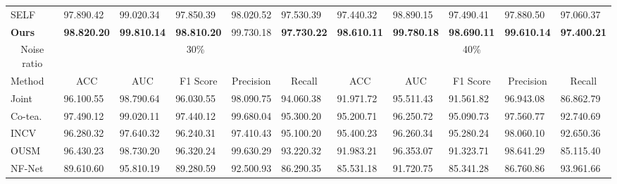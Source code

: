 \begin{table*}[]
\begin{tabular}{@{}lllllllllll@{}}
SELF                            & 97.890.42          & 99.020.34          & 97.850.39               & 98.020.52          & 97.530.39             & 97.440.32          & 98.890.15          & 97.490.41               & 97.880.50          & 97.060.37             \\
\textbf{Ours}                   & \textbf{98.820.20} & \textbf{99.810.14} & \textbf{98.810.20}      & 99.730.18          & \textbf{97.730.22}    & \textbf{98.610.11} & \textbf{99.780.18} & \textbf{98.690.11}      & \textbf{99.610.14} & \textbf{97.400.21}    \\ \midrule
\multicolumn{1}{c}{Noise ratio} & \multicolumn{5}{c}{30\%}                                                                                                                & \multicolumn{5}{c}{40\%}                                                                                                                \\ \midrule
Method                & \multicolumn{1}{c}{ACC} & \multicolumn{1}{c}{AUC} & \multicolumn{1}{c}{F1 Score} & \multicolumn{1}{c}{{Precision}} & \multicolumn{1}{c}{Recall} & \multicolumn{1}{c}{ACC} & \multicolumn{1}{c}{AUC} & \multicolumn{1}{c}{F1 Score} & \multicolumn{1}{c}{{Precision}} & \multicolumn{1}{c}{Recall} \\ \midrule
Joint                     & 96.100.55          & 98.790.64          & 96.030.55               & 98.090.75          & 94.060.38             & 91.971.72          & 95.511.43          & 91.561.82               & 96.943.08          & 86.862.79             \\
Co-tea.                     & 97.490.12          & 99.020.11          & 97.440.12               & 99.680.04          & 95.300.20             & 95.200.71          & 96.250.72          & 95.090.73               & 97.560.77          & 92.740.69             \\
INCV                            & 96.280.32          & 97.640.32          & 96.240.31               & 97.410.43          & 95.100.20             & 95.400.23          & 96.260.34          & 95.280.24               & 98.060.10          & 92.650.36             \\
OUSM                       & 96.430.23          & 98.730.20          & 96.320.24               & 99.630.29          & 93.220.32             & 91.983.21          & 96.353.07          & 91.323.71               & 98.641.29          & 85.115.40             \\
NF-Net                          & 89.610.60          & 95.810.19          & 89.280.59               & 92.500.93          & 86.290.35             & 85.531.18          & 91.720.75          & 85.341.28               & 86.760.86          & 93.961.66             \\

\end{tabular}
\end{table*}
